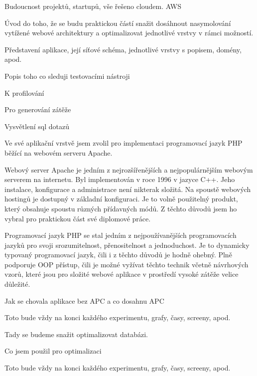 \documentclass[12pt]{article}
\begin{document}
Budoucnost projektů, startupů, vše řešeno cloudem. AWS




Úvod do toho, že se budu praktickou částí snažit dosáhnout nasymolování vytížené webové architektury a optimalizovat jednotlivé vrstvy v rámci možností.

Představení aplikace, její síťové schéma, jednotlivé vrstvy s popisem, domény, apod.

Popis toho co sleduji testovacími nástroji

K profilování

Pro generování zátěže

Vysvětlení sql dotazů

Ve své aplikační vrstvě jsem zvolil pro implementaci programovací jazyk PHP běžící na webovém serveru Apache.

Webový server Apache je jedním z nejrozšířenějších a nejpopulárnějším webovým serverem na internetu. Byl implementován v roce 1996 v jazyce C++. Jeho instalace, konfigurace a administrace není nikterak složitá. Na spoustě webových hostingů je dostupný v základní konfiguraci. Je to volně použitelný produkt, který obsahuje spoustu různých přídavných módů. Z těchto důvodů jsem ho vybral pro praktickou část své diplomové práce.

Programovací jazyk PHP se stal jedním z nejpoužívanějších programovacích jazyků pro svoji srozumitelnost, přenositelnost a jednoduchost. Je to dynamicky typovaný programovací jazyk, čili i z těchto důvodů je hodně ohebný. Plně podporuje OOP přístup, čili je možné vyžívat těchto technik včetně návrhových vzorů, které jsou pro složité webové aplikace v prostředí vysoké zátěže velice důležité.


Jak se chovala aplikace bez APC a co dosahnu APC

Toto bude vždy na konci každého experimentu, grafy, časy, screeny, apod.

Tady se budeme snažit optimalizovat databázi.

Co jsem použil pro optimalizaci

Toto bude vždy na konci každého experimentu, grafy, časy, screeny, apod.
\end{document}
